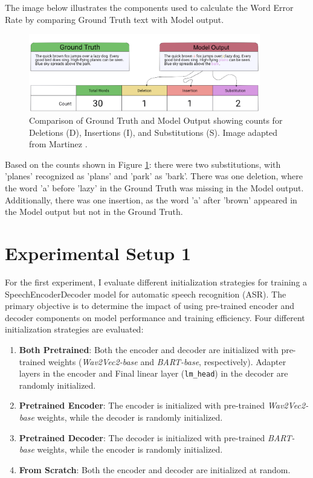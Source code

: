 The image below illustrates the components used to calculate the Word Error Rate by comparing Ground Truth text with Model output.

\begin{figure}[!h]
    \centering
    \includegraphics[width=0.9\textwidth]{obrazky-figures/werpls2.png}
    \caption{Comparison of Ground Truth and Model Output showing counts for Deletions (D), Insertions (I), and Substitutions (S). Image adapted from Martinez \cite{Martinez2025_OCRAccuracy}.}
    \label{fig:wer_calculation}
\end{figure}

Based on the counts shown in Figure \ref{fig:wer_calculation}: there were two substitutions, with 'planes' recognized as 'plans' and 'park' as 'bark'. There was one deletion, where the word 'a' before 'lazy' in the Ground Truth was missing in the Model output. Additionally, there was one insertion, as the word 'a' after 'brown' appeared in the Model output but not in the Ground Truth.


\section{Experimental Setup 1}
For the first experiment, I evaluate different initialization strategies for training a SpeechEncoderDecoder model for automatic speech recognition (ASR). The primary objective is to determine the impact of using pre-trained encoder and decoder components on model performance and training efficiency. Four different initialization strategies are evaluated:


\begin{enumerate}
    \item \textbf{Both Pretrained}: Both the encoder and decoder are initialized with pre-trained weights (\textit{Wav2Vec2-base} and \textit{BART-base}, respectively). Adapter layers in the encoder and Final linear layer (\texttt{lm\_head}) in the decoder are randomly initialized.
    \item \textbf{Pretrained Encoder}: The encoder is initialized with pre-trained \textit{Wav2Vec2-base} weights, while the decoder is randomly initialized.
    \item \textbf{Pretrained Decoder}: The decoder is initialized with pre-trained \textit{BART-base} weights, while the encoder is randomly initialized.
    \item \textbf{From Scratch}: Both the encoder and decoder are initialized at random.
\end{enumerate}

